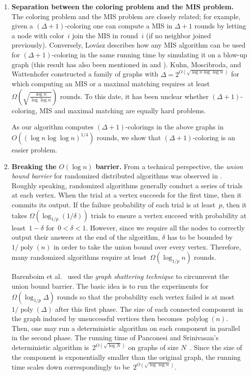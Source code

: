 \documentclass[11pt]{amsart}
\newcommand{\polylog}{\operatorname{polylog}}
\newcommand{\poly}{\operatorname{poly}}
\begin{document}
\begin{enumerate}
\item {\bf Separation between the coloring problem and the MIS problem.}  The coloring problem and the MIS problem are closely related; for example, given a $(\Delta+1)$-coloring one can compute a MIS in $\Delta+1$ rounds by letting a node with color~$i$ join the MIS in round~$i$ (if no neighbor joined previously). Conversely, Lov\'{a}sz describes how any MIS algorithm can be used for $(\Delta+1)$-coloring in the same running time by simulating it on a blow-up graph \cite{lov79} (this result has also been mentioned in \cite{lub86} and \cite{alon86}). Kuhn, Moscibroda, and Wattenhofer \cite{kuh10} constructed a family of graphs with $\Delta = 2^{O(\sqrt{\log n \log \log n})}$ for which computing an MIS or a maximal matching requires at least~$\Omega(\sqrt{\frac{\log n}{\log \log n}})$ rounds. To this date, it has been unclear whether $(\Delta +1)$-coloring,  MIS and maximal matching are equally hard problems.

As our algorithm computes $(\Delta+1)$-colorings in the above graphs in $O((\log n \log \log n)^{1/4})$ rounds, we show that $(\Delta+1)$-coloring is an easier problem.

\item {\bf Breaking the $O(\log n)$ barrier.} From a technical perspective, the {\it union bound barrier} for randomized distributed algorithms was observed in \cite{bar15}. Roughly speaking, randomized algorithms generally conduct a series of trials at each vertex. When the trial at a vertex succeeds for the first time, then it commits its output. If the failure probability of each trial is at least~$p$, then it takes $\Omega(\log_{1/p} (1/\delta) )$ trials to ensure a vertex succeed with probability at least~$1 - \delta$ for~$0 < \delta < 1$.  However, since we require all the nodes to correctly output their answers at the end of the algorithm, $\delta$ has to be bounded by $1/\poly(n)$ in order to take the union bound over every vertex. Therefore, many randomized algorithms require at least~$\Omega(\log_{1/p} n)$ rounds. 
	
Barenboim et al.~\cite{bar15a} used the {\it graph shattering technique} to circumvent the union bound barrier. The basic idea is to run the experiments for~$\Omega(\log_{1/p} \Delta)$ rounds so that the probability each vertex failed is at most~$1/\poly(\Delta)$ after this first phase. The size of each connected component in the graph induced by unsuccessful vertices then becomes $\polylog (n)$. Then, one may run a deterministic algorithm on each component in parallel in the second phase. The running time of Panconesi and Srinivasan's deterministic algorithm is~$2^{O(\sqrt{\log N})}$ on graphs of size $N$~\cite{panc92}. Since the size of the component is exponentially smaller than the original graph, the running time scales down correspondingly to be~$2^{O(\sqrt{\log \log n})}$. 
	

\end{enumerate}
\end{document}
